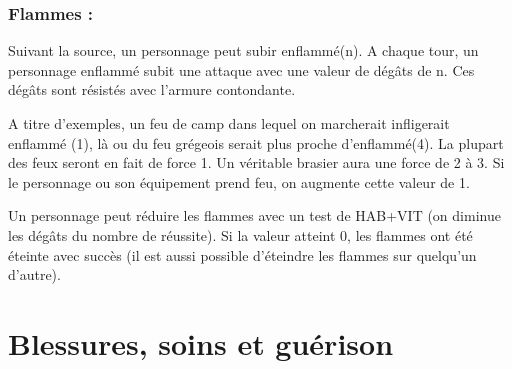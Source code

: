 \documentclass[10pt,a4paper,twocolumn]{book}
\begin{document}
\subsubsection{Flammes :}
Suivant la source, un personnage peut subir enflammé(n). A chaque tour, un personnage enflammé subit une attaque avec une valeur de dégâts de n. Ces dégâts sont résistés avec l'armure contondante.

A titre d’exemples, un feu de camp dans lequel on marcherait infligerait enflammé (1), là ou du feu grégeois serait plus proche d’enflammé(4).
La plupart des feux seront en fait de force 1. Un véritable brasier aura une force de 2 à 3. Si le personnage ou son équipement prend feu, on augmente cette valeur de 1.


Un personnage peut réduire les flammes avec un test de HAB+VIT (on diminue les dégâts du nombre de réussite). Si la valeur atteint 0, les flammes ont été éteinte avec succès (il est aussi possible d’éteindre les flammes sur quelqu’un d’autre).
\section{Blessures, soins et guérison}
\end{document}
